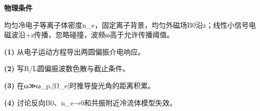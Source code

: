 \textbf{物理条件}\par 均匀冷电子等离子体密度n\_e，固定离子背景，均匀外磁场B0沿z；线性小信号电磁波沿+z传播，忽略碰撞，波频ω高于允许传播阈值。
\par\noindent\textbf{(1)} 从电子运动方程导出两圆偏振介电响应。
\par\noindent\textbf{(2)} 写R/L圆偏振波数色散与截止条件。
\par\noindent\textbf{(3)} 在ω≫ω\_p,|Ω\_e|时推导旋光角的距离积累。
\par\noindent\textbf{(4)} 讨论反向B0、n\_e→0和共振附近冷流体模型失效。

